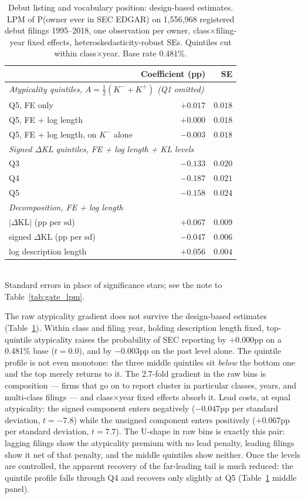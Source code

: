 \documentclass[11pt]{article}
\newcommand{\dkl}{$\Delta$KL}
\begin{document}
\begin{table}[h]\centering\small
\caption{Debut listing and vocabulary position: design-based estimates.
LPM of P(owner ever in SEC EDGAR) on 1{,}556{,}968 registered debut
filings 1995--2018, one observation per owner, class$\times$filing-year
fixed effects, heteroskedasticity-robust SEs. Quintiles cut within
class$\times$year. Base rate 0.481\%.}
\label{tab:edgar}
\begin{tabular}{lrr}
\toprule
 & Coefficient (pp) & SE \\
\midrule
\multicolumn{3}{l}{\emph{Atypicality quintiles, $A = \tfrac{1}{2}(K^{-}+K^{+})$ (Q1 omitted)}} \\
\quad Q5, FE only & $+0.017$ & $0.018$ \\
\quad Q5, FE + log length & $+0.000$ & $0.018$ \\
\quad Q5, FE + log length, on $K^{-}$ alone & $-0.003$ & $0.018$ \\
\midrule
\multicolumn{3}{l}{\emph{Signed \dkl{} quintiles, FE + log length + KL levels}} \\
\quad Q3 & $-0.133$ & $0.020$ \\
\quad Q4 & $-0.187$ & $0.021$ \\
\quad Q5 & $-0.158$ & $0.024$ \\
\midrule
\multicolumn{3}{l}{\emph{Decomposition, FE + log length}} \\
\quad $|\Delta\mathrm{KL}|$ (pp per sd) & $+0.067$ & $0.009$ \\
\quad signed \dkl{} (pp per sd) & $-0.047$ & $0.006$ \\
\quad log description length & $+0.056$ & $0.004$ \\
\bottomrule
\end{tabular}
\\[0.3em]\footnotesize Standard errors in place of significance stars; see the
note to Table~\ref{tab:gate_lpm}.
\end{table}

The raw atypicality gradient does not survive the design-based estimates (Table~\ref{tab:edgar}). Within class and filing year, holding description length
fixed, top-quintile atypicality raises the probability of SEC reporting by
$+0.000$pp on a 0.481\% base ($t = 0.0$), and by $-0.003$pp on the past
level alone. The quintile profile is not even monotone: the three middle
quintiles sit \emph{below} the bottom one and the top merely returns to it.
The 2.7-fold gradient in the raw bins is composition --- firms that go on to
report cluster in particular classes, years, and multi-class filings --- and
class$\times$year fixed effects absorb it. Lead costs, at equal
atypicality: the signed component enters negatively
($-0.047$pp per standard deviation, $t = -7.8$) while the unsigned component enters
positively ($+0.067$pp per standard deviation, $t = 7.7$). The U-shape in raw bins
is exactly this pair: lagging filings show the atypicality premium with no
lead penalty, leading filings show it net of that penalty, and the middle
quintiles show neither. Once the levels are controlled,
the apparent recovery of the far-leading tail is much reduced: the quintile
profile falls through Q4 and recovers only slightly at Q5
(Table~\ref{tab:edgar} middle panel).
\end{document}

